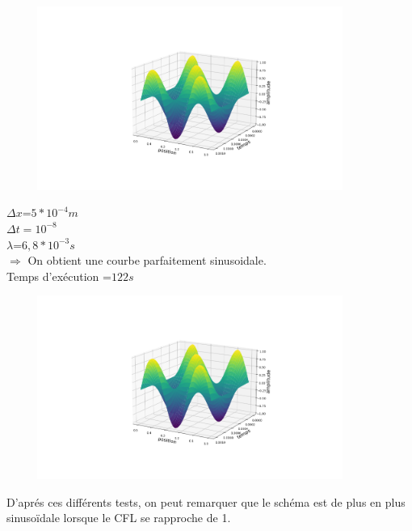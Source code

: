 \begin{enumerate}[label=\alph*)]
\begin{minipage}{.5\textwidth}
\end{minipage}%
\hfill
\begin{minipage}{.45\textwidth}%
\includegraphics[width=12cm,height=6cm]{explicitee.png}

\end{minipage}%

\begin{minipage}{.5\textwidth}%


\item $\Delta x$=$5*{10}^{-4}m$\\
$\Delta t={10}^{-8}$\\
$\lambda$=$6,8*{10}^{-3}s$\\


$\Longrightarrow$ On obtient une courbe parfaitement sinusoidale.\\
Temps d'exécution =$122s$
\end{minipage}%
\hfill
\begin{minipage}{.45\textwidth}%
\includegraphics[width=12cm,height=6cm]{explicitee.png}
\end{minipage}%



\end{enumerate}
D'aprés ces différents tests, on peut remarquer que le schéma est de plus en plus sinusoïdale lorsque le CFL se rapproche de 1.\\



